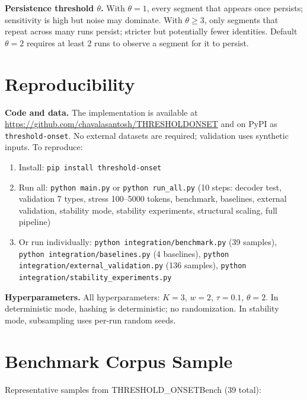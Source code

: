 \textbf{Persistence threshold $\theta$.}
With $\theta=1$, every segment that appears once persists; sensitivity is high but noise may dominate. With $\theta \geq 3$, only segments that repeat across many runs persist; stricter but potentially fewer identities. Default $\theta=2$ requires at least 2 runs to observe a segment for it to persist.

\section{Reproducibility}

\textbf{Code and data.}
The implementation is available at \url{https://github.com/chavalasantosh/THRESHOLDONSET} and on PyPI as \texttt{threshold-onset}. No external datasets are required; validation uses synthetic inputs. To reproduce:

\begin{enumerate}
\item Install: \texttt{pip install threshold-onset}
\item Run all: \texttt{python main.py} or \texttt{python run\_all.py} (10 steps: decoder test, validation 7 types, stress 100--5000 tokens, benchmark, baselines, external validation, stability mode, stability experiments, structural scaling, full pipeline)
\item Or run individually: \texttt{python integration/benchmark.py} (39 samples), \texttt{python integration/baselines.py} (4 baselines), \texttt{python integration/external\_validation.py} (136 samples), \texttt{python integration/stability\_experiments.py}
\end{enumerate}

\textbf{Hyperparameters.}
All hyperparameters: $K=3$, $w=2$, $\tau=0.1$, $\theta=2$. In deterministic mode, hashing is deterministic; no randomization. In stability mode, subsampling uses per-run random seeds.

\section{Benchmark Corpus Sample}
\label{app:corpus}

Representative samples from THRESHOLD\_ONSETBench (39 total):

